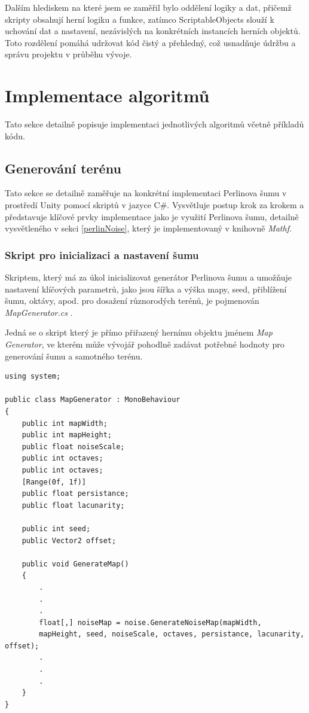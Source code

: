 Dalším hlediskem na které jsem se zaměřil bylo oddělení logiky a dat, přičemž skripty obsahují herní logiku a funkce, zatímco ScriptableObjects slouží k uchování dat a nastavení, nezávislých na konkrétních instancích herních objektů. Toto rozdělení pomáhá udržovat kód čistý a přehledný, což usnadňuje údržbu a správu projektu v průběhu vývoje.

\section{Implementace algoritmů}
Tato sekce detailně popisuje implementaci jednotlivých algoritmů včetně příkladů kódu.

\subsection{Generování terénu}
Tato sekce se detailně zaměřuje na konkrétní implementaci Perlinova šumu v prostředí Unity pomocí skriptů v jazyce C\#. Vysvětluje postup krok za krokem a představuje klíčové prvky implementace jako je využití Perlinova šumu, detailně vysvětleného v sekci \ref{perlinNoise}, který je implementovaný v knihovně \textit{Mathf}. 

\subsubsection{Skript pro inicializaci a nastavení šumu}
Skriptem, který má za úkol inicializovat generátor Perlinova šumu a umožňuje nastavení klíčových parametrů, jako jsou šířka a výška mapy, seed, přiblížení šumu, oktávy, apod. pro dosažení různorodých terénů, je pojmenován \textit{MapGenerator.cs} . 

Jedná se o skript který je přímo přiřazený hernímu objektu jménem \textit{Map Generator}, ve kterém může vývojář pohodlně zadávat potřebné hodnoty pro generování šumu a samotného terénu.

\begin{lstlisting}
using system;

public class MapGenerator : MonoBehaviour
{
	public int mapWidth;
	public int mapHeight;
	public float noiseScale;
	public int octaves;
	public int octaves;
	[Range(0f, 1f)]
	public float persistance;
	public float lacunarity;
	
	public int seed;
	public Vector2 offset;	
	
	public void GenerateMap()
	{
		.
		.
		.
		float[,] noiseMap = noise.GenerateNoiseMap(mapWidth, 
		mapHeight, seed, noiseScale, octaves, persistance, lacunarity, offset);
		.
		.
		.
	}
}
\end{lstlisting}

